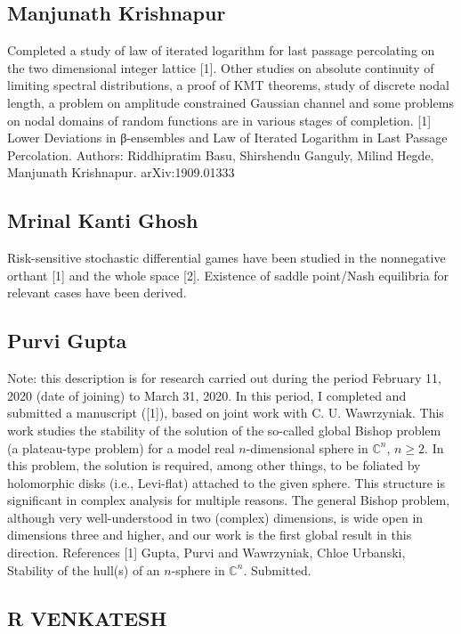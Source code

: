 \subsection{Manjunath Krishnapur}

Completed a study of law of iterated logarithm for last passage percolating on the two dimensional integer lattice [1]. Other studies on absolute continuity of limiting spectral distributions, a proof of KMT theorems, study of discrete nodal length, a problem on amplitude constrained Gaussian channel and some problems on nodal domains of random functions are in various stages of completion.  [1] Lower Deviations in β-ensembles and Law of Iterated Logarithm in Last Passage Percolation.   Authors: Riddhipratim Basu, Shirshendu Ganguly, Milind Hegde, Manjunath Krishnapur. arXiv:1909.01333


\subsection{Mrinal Kanti Ghosh}

Risk-sensitive stochastic differential games have been studied in the nonnegative orthant [1] and the whole space [2]. Existence of saddle point/Nash equilibria for relevant cases have been derived. 


\subsection{Purvi Gupta}

Note: this description is for research carried out during the period February 11, 2020 (date of joining) to March 31, 2020.   In this period,  I completed and submitted a manuscript ([1]),  based on joint work with C. U. Wawrzyniak. This work studies the stability of the solution of the so-called global Bishop problem (a plateau-type problem) for a model real $n$-dimensional sphere in $\mathbb{C}^n$, $n\geq 2$. In this problem, the solution is required, among other things, to be foliated by holomorphic disks (i.e., Levi-flat) attached to the given sphere. This structure is significant in complex analysis for multiple reasons. The general Bishop problem, although very well-understood in two (complex) dimensions, is wide open in dimensions three and higher, and our work is the first global result in this direction.    References [1] Gupta, Purvi and Wawrzyniak, Chloe Urbanski, Stability of the hull(s) of an $n$-sphere in $\mathbb{C}^n$. Submitted. 


\subsection{R VENKATESH}

